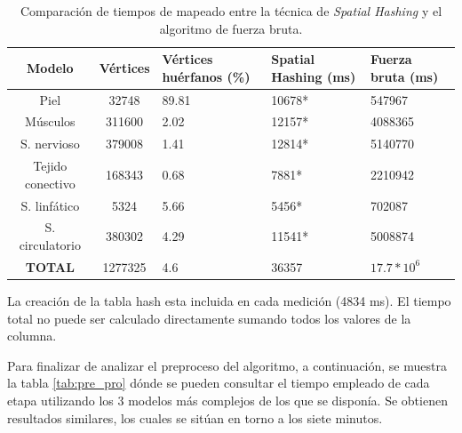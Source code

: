 \begin{table}[h]
\begin{threeparttable}
\centering
\caption{Comparación de tiempos de mapeado entre la técnica de \emph{Spatial Hashing} y el algoritmo de fuerza bruta. }
\label{tab:bruteforce}
\begin{tabular}{|c|c|x{25mm}|x{25mm}|x{25mm}|}
\hline
\textbf{Modelo} & \textbf{Vértices} & \textbf{Vértices  huérfanos (\%)}  & \textbf{Spatial Hashing (ms)} & \textbf{Fuerza bruta (ms)} \\ 
\hline
Piel             &32748      &89.81   &10678* &547967\\
\hline
Músculos         &311600     &2.02    &12157* &4088365\\ 
\hline
S. nervioso      &379008     &1.41    &12814* &5140770\\ 
\hline
Tejido conectivo &168343     &0.68    &7881*  &2210942\\ 
\hline
S. linfático     &5324       &5.66    &5456*  &702087\\ 
\hline
S. circulatorio  &380302     &4.29    &11541* &5008874\\ 
\hline
\textbf{TOTAL}   &1277325    &4.6     &36357  &$17.7*10^6$ \\
\hline
\end{tabular}
\begin{tablenotes}
      \small
      \item * La creación de la \ac{tabla hash} esta incluida en cada medición (4834 ms). El tiempo total no puede ser calculado directamente sumando todos los valores de la columna.
\end{tablenotes}
\end{threeparttable}
\end{table}

Para finalizar de analizar el preproceso del algoritmo, a continuación, se muestra la tabla \ref{tab:pre_pro} dónde se pueden consultar el tiempo empleado de cada etapa utilizando los 3 modelos más complejos de los que se disponía. Se obtienen resultados similares, los cuales se sitúan en torno a los siete minutos.






